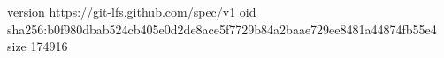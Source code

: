 version https://git-lfs.github.com/spec/v1
oid sha256:b0f980dbab524cb405e0d2de8ace5f7729b84a2baae729ee8481a44874fb55e4
size 174916
